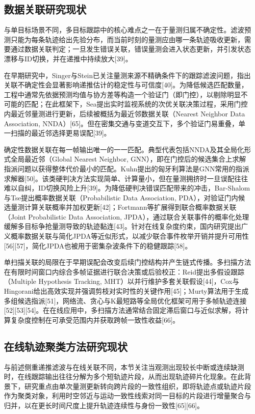 \documentclass{xdupgthesis}
\begin{document}
\subsection{数据关联研究现状}
与单目标场景不同，多目标跟踪中的核心难点之一在于量测归属不确定性。滤波预测只能为每条轨迹给出先验分布，而当前时刻的量测应由哪一条轨迹吸收更新，需要通过数据关联判定；一旦发生错误关联，错误量测会进入状态更新，并引发状态漂移与ID切换，并在递推中持续放大[39]。

在早期研究中，Singer与Stein已关注量测来源不精确条件下的跟踪滤波问题，指出关联不确定性会显著影响递推估计的稳定性与可信度[40]。为降低候选匹配数量，工程中通常先依据预测均值与协方差等构造一个验证门（即门控），以剔除明显不可能的匹配；在此框架下，Sea提出实时监视系统的次优关联决策过程，采用门控内最近邻量测进行更新，后续被概括为最近邻数据关联（Nearest Neighbor Data Association, NNDA）[65]。但在密集交通与变道交互下，多个验证门易重叠，单一扫描的最近邻选择更易误配[39]。

确定性数据关联在每一帧输出唯一的一一匹配。典型代表包括NNDA及其全局化形式全局最近邻（Global Nearest Neighbor, GNN），即在门控后的候选集合上求解指派问题以获得整体代价最小的匹配。Kuhn提出的匈牙利算法是GNN常用的指派求解器[50]。该类硬判决方法实现简单、计算量小，但在量测拥挤时一旦误配往往难以自纠，ID切换风险上升[39]。为降低硬判决错误匹配带来的冲击，Bar-Shalom与Tse提出概率数据关联（Probabilistic Data Association, PDA），对验证门内候选量测计算关联概率并加权更新[42]；Fortmann等扩展得到联合概率数据关联（Joint Probabilistic Data Association, JPDA），通过联合关联事件的概率化处理缓解多目标争抢量测导致的轨迹黏连[43]。针对在线复杂度约束，国内研究提出广义概率数据关联与简化JPDA等近似形式，以减少联合事件枚举开销并提升可用性[56][57]，简化JPDA也被用于密集杂波条件下的稳健跟踪[58]。

单扫描关联的局限在于早期误配会改变后续门控结构并产生链式传播。多扫描方法在有限时间窗口内综合多帧证据进行联合决策或后验校正：Reid提出多假设跟踪（Multiple Hypothesis Tracking, MHT）以并行维护多套关联假设[44]，Cox与Hingorani给出高效实现并强调剪枝对实时性的关键作用[45]；Murty算法用于生成多组候选指派[51]，网络流、贪心与K最短路等全局优化框架可用于多帧轨迹连接[52][53][54]。在在线应用中，多扫描方法通常结合固定滞后窗口与近似求解，将计算复杂度控制在可承受范围内并获取跨帧一致性收益[66]。

\subsection{在线轨迹聚类方法研究现状}
与前述侧重递推滤波与在线关联不同，本节关注当观测出现较长中断或连续缺测时，在线跟踪输出往往分解为多个短轨迹片段，从而出现轨迹碎片化现象。在此背景下，研究重点由单次量测更新转向跨片段的一致性组织，即将轨迹点或轨迹片段作为聚类对象，利用时空邻近与运动一致性线索对同一目标的片段进行增量聚合与归并，以在更长时间尺度上提升轨迹连续性与身份一致性[65][66]。
\end{document}
